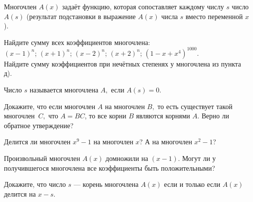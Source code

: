 \documentclass[a4paper, 12pt]{article}
\begin{document}
\noindent





Многочлен $A(x)$ зада\"ет функцию, которая сопоставляет каждому числу $s$ %
число $A(s)$ (результат подстановки в выражение $A(x)$ числа $s$ вместо переменной $x$).

Найдите сумму всех коэффициентов многочлена:\\
 $(x-1)^{n}$;
 $(x+1)^{n}$;
 $(x-2)^{n}$;
 $(x+2)^{n}$;
 $(1-x+x^4)^{1000}.$\\
 Найдите сумму коэффициентов при неч\"етных степенях
у многочлена из пункта д).






Число  $s$  называется  многочлена  $A,$  если  $A(s)=0.$


 Докажите, что если многочлен $A$  на многочлен $B,$
то есть существует такой многочлен~$C,$ что $A=BC$, то
все корни $B$ являются корнями $A.$ Верно ли
обратное утверждение?

 Делится ли многочлен $x^9-1$ на многочлен $x$?
А на многочлен $x^2-1$?

  Произвольный многочлен $A(x)$ домножили на $(x-1)$. Могут ли у
получившегося многочлена все коэффициенты быть положительными?

Докажите, что число $s$ --- корень многочлена $A(x)$
если и только если $A(x)$ делится на $x-s$.
\end{document}
